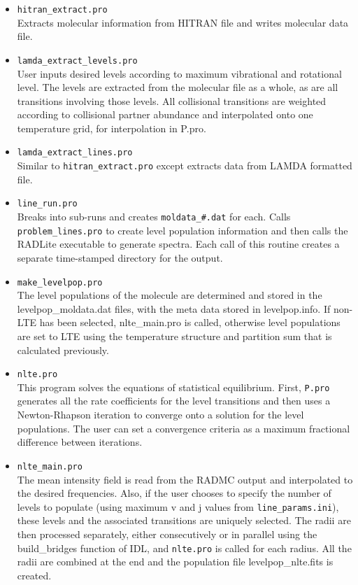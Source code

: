 \documentclass[11pt]{article}
\begin{document}
\begin{itemize}

\item {\tt hitran\_extract.pro}\\
Extracts molecular information from HITRAN file and writes molecular data file.

\item{\tt lamda\_extract\_levels.pro}\\
User inputs desired levels according to maximum vibrational and rotational level.  The levels are extracted from the molecular file as a whole, as are all transitions involving those levels.  All collisional transitions are weighted according to collisional partner abundance and interpolated onto one temperature grid, for interpolation in P.pro.

\item {\tt lamda\_extract\_lines.pro}\\
Similar to {\tt hitran\_extract.pro} except extracts data from LAMDA formatted file.

\item {\tt line\_run.pro}\\
Breaks into sub-runs and creates {\tt moldata\_\#.dat} for each.  Calls {\tt problem\_lines.pro} to create level population information and then calls the RADLite executable to generate spectra.  Each call of this routine creates a separate time-stamped directory for the output.

\item{\tt make\_levelpop.pro}\\
The level populations of the molecule are determined and stored in the levelpop\_moldata.dat files, with the meta data stored in levelpop.info.  If non-LTE has been selected, nlte\_main.pro is called, otherwise level populations are set to LTE using the temperature structure and partition sum that is calculated previously.

\item{\tt nlte.pro}\\
This program solves the equations of statistical equilibrium.  First, {\tt P.pro} generates all the rate coefficients for the level transitions and then uses a Newton-Rhapson iteration to converge onto a solution for the level populations.  The user can set a convergence criteria as a maximum fractional difference between iterations.  

\item{\tt nlte\_main.pro}\\
The mean intensity field is read from the RADMC output and interpolated to the desired frequencies.  Also, if the user chooses to specify the number of levels to populate (using maximum v and j values from {\tt line\_params.ini}), these levels and the associated transitions are uniquely selected.  The radii are then processed separately, either consecutively or in parallel using the build\_bridges function of IDL, and {\tt nlte.pro} is called for each radius.  All the radii are combined at the end and the population file levelpop\_nlte.fits is created.


\end{itemize}
\end{document}
